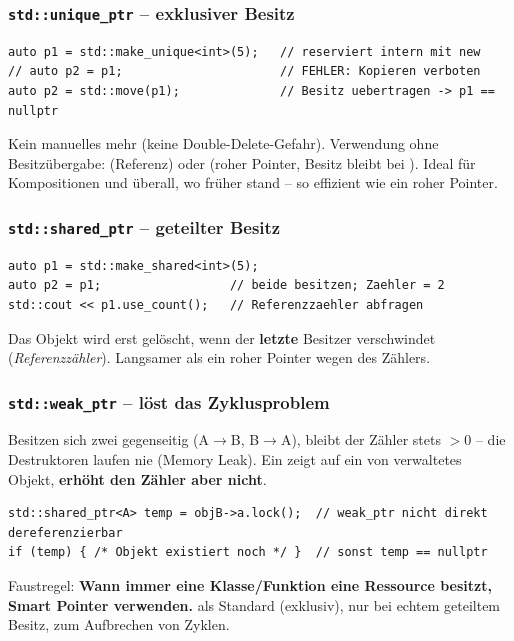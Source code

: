 \subsubsection*{\texttt{std::unique\_ptr} -- exklusiver Besitz}
\begin{lstlisting}
auto p1 = std::make_unique<int>(5);   // reserviert intern mit new
// auto p2 = p1;                      // FEHLER: Kopieren verboten
auto p2 = std::move(p1);              // Besitz uebertragen -> p1 == nullptr
\end{lstlisting}
Kein manuelles  mehr (keine Double-Delete-Gefahr). Verwendung ohne Besitz\"ubergabe:  (Referenz) oder  (roher Pointer, Besitz bleibt bei ). Ideal f\"ur Kompositionen und \"uberall, wo fr\"uher  stand -- so effizient wie ein roher Pointer.

\subsubsection*{\texttt{std::shared\_ptr} -- geteilter Besitz}
\begin{lstlisting}
auto p1 = std::make_shared<int>(5);
auto p2 = p1;                  // beide besitzen; Zaehler = 2
std::cout << p1.use_count();   // Referenzzaehler abfragen
\end{lstlisting}
Das Objekt wird erst gel\"oscht, wenn der \textbf{letzte} Besitzer verschwindet (\emph{Referenzz\"ahler}). Langsamer als ein roher Pointer wegen des Z\"ahlers.

\subsubsection*{\texttt{std::weak\_ptr} -- l\"ost das Zyklusproblem}
Besitzen sich zwei  gegenseitig (A$\to$B, B$\to$A), bleibt der Z\"ahler stets $>0$ -- die Destruktoren laufen nie (Memory Leak). Ein  zeigt auf ein von  verwaltetes Objekt, \textbf{erh\"oht den Z\"ahler aber nicht}.
\begin{lstlisting}
std::shared_ptr<A> temp = objB->a.lock();  // weak_ptr nicht direkt dereferenzierbar
if (temp) { /* Objekt existiert noch */ }  // sonst temp == nullptr
\end{lstlisting}
\begin{merke}
Faustregel: \textbf{Wann immer eine Klasse/Funktion eine Ressource besitzt, Smart Pointer verwenden.}  als Standard (exklusiv),  nur bei echtem geteiltem Besitz,  zum Aufbrechen von Zyklen.
\end{merke}
\clearpage
